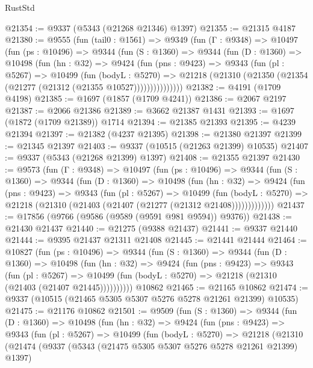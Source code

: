 \begin{lexlean}{RustStd}
\begin{coremodule}
@21354 := @9337 (@5343 (@21268 @21346) @1397)
@21355 := @21315 @4187
@21380 := @9555
    (fun (tail0 : @1561) =>
    @9349
      (fun (Γ : @9348) =>
      @10497
        (fun (ps : @10496) =>
        @9344
          (fun (S : @1360) =>
          @9344
            (fun (D : @1360) =>
            @10498
              (fun (hn : @32) =>
              @9424
                (fun (pns : @9423) =>
                @9343
                  (fun (pl : @5267) =>
                  @10499
                    (fun (bodyL : @5270) =>
                    @21218 (@21310 (@21350 (@21354 (@21277 (@21312 (@21355 @10527)))))))))))))))
@21382 := @4191 (@1709 @4198)
@21385 := @1697 (@1857 (@1709 @4241))
@21386 := @2067 @2197
@21387 := @2066 @21386
@21389 := @3662 @21387 @1431
@21393 := @1697 (@1872 (@1709 @21389)) @1714
@21394 := @21385 @21393
@21395 := @4239 @21394
@21397 := @21382 (@4237 @21395)
@21398 := @21380 @21397
@21399 := @21345 @21397
@21403 := @9337 (@10515 (@21263 @21399) @10535)
@21407 := @9337 (@5343 (@21268 @21399) @1397)
@21408 := @21355 @21397
@21430 := @9573
    (fun (Γ : @9348) =>
    @10497
      (fun (ps : @10496) =>
      @9344
        (fun (S : @1360) =>
        @9344
          (fun (D : @1360) =>
          @10498
            (fun (hn : @32) =>
            @9424
              (fun (pns : @9423) =>
              @9343
                (fun (pl : @5267) =>
                @10499
                  (fun (bodyL : @5270) =>
                  @21218 (@21310 (@21403 (@21407 (@21277 (@21312 @21408)))))))))))))
@21437 := @17856 (@9766 (@9586 (@9589 (@9591 @981 @9594)) @9376))
@21438 := @21430 @21437
@21440 := @21275 (@9388 @21437)
@21441 := @9337 @21440
@21444 := @9395 @21437 @21311 @21408
@21445 := @21441 @21444
@21464 := @10827
    (fun (ps : @10496) =>
    @9344
      (fun (S : @1360) =>
      @9344
        (fun (D : @1360) =>
        @10498
          (fun (hn : @32) =>
          @9424
            (fun (pns : @9423) =>
            @9343
              (fun (pl : @5267) =>
              @10499 (fun (bodyL : @5270) => @21218 (@21310 (@21403 (@21407 @21445))))))))))
    @10862
@21465 := @21165 @10862
@21474 := @9337 (@10515 (@21465 @5305 @5307 @5276 @5278 @21261 @21399) @10535)
@21475 := @21176 @10862
@21501 := @9509
    (fun (S : @1360) =>
    @9344
      (fun (D : @1360) =>
      @10498
        (fun (hn : @32) =>
        @9424
          (fun (pns : @9423) =>
          @9343
            (fun (pl : @5267) =>
            @10499
              (fun (bodyL : @5270) =>
              @21218
                (@21310
                  (@21474
                    (@9337
                      (@5343 (@21475 @5305 @5307 @5276 @5278 @21261 @21399) @1397)

\end{coremodule}
\end{lexlean}
